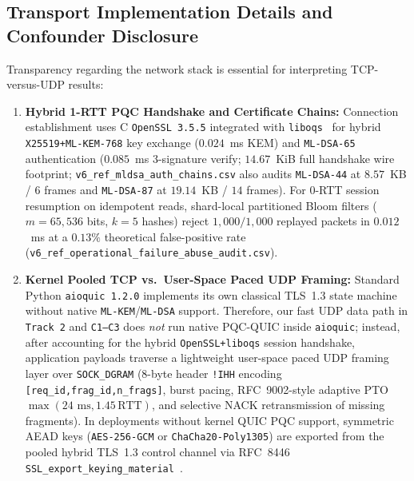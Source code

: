 \documentclass[10pt,journal,compsoc]{IEEEtran}
\begin{document}
\subsection{Transport Implementation Details and Confounder Disclosure}

Transparency regarding the network stack is essential for interpreting TCP-versus-UDP results:
\begin{enumerate}
    \item \textbf{Hybrid 1-RTT PQC Handshake and Certificate Chains:} Connection establishment uses C \texttt{OpenSSL~3.5.5} integrated with \texttt{liboqs}~\cite{stebila2017oqs} for hybrid \nolinkurl{X25519+ML-KEM-768} key exchange ($0.024$~ms KEM) and \texttt{ML-DSA-65} authentication ($0.085$~ms 3-signature verify; $14.67$~KiB full handshake wire footprint; \nolinkurl{v6_ref_mldsa_auth_chains.csv} also audits \texttt{ML-DSA-44} at $8.57$~KB / $6$ frames and \texttt{ML-DSA-87} at $19.14$~KB / $14$ frames). For 0-RTT session resumption on idempotent reads, shard-local partitioned Bloom filters ($m=65{,}536$ bits, $k=5$ hashes) reject $1{,}000/1{,}000$ replayed packets in $0.012$~ms at a $0.13\%$ theoretical false-positive rate (\nolinkurl{v6_ref_operational_failure_abuse_audit.csv}).
    \item \textbf{Kernel Pooled TCP vs.\ User-Space Paced UDP Framing:} Standard Python \texttt{aioquic~1.2.0} implements its own classical TLS~1.3 state machine without native \texttt{ML-KEM}/\texttt{ML-DSA} support. Therefore, our fast UDP data path in \texttt{Track~2} and \texttt{C1--C3} does \emph{not} run native PQC-QUIC inside \texttt{aioquic}; instead, after accounting for the hybrid \nolinkurl{OpenSSL+liboqs} session handshake, application payloads traverse a lightweight user-space paced UDP framing layer over \nolinkurl{SOCK_DGRAM} (8-byte header \texttt{!IHH} encoding \nolinkurl{[req_id,frag_id,n_frags]}, burst pacing, RFC~9002-style adaptive PTO $\max(24\text{ ms}, 1.45\,\mathrm{RTT})$, and selective NACK retransmission of missing fragments). In deployments without kernel QUIC PQC support, symmetric AEAD keys (\texttt{AES-256-GCM} or \nolinkurl{ChaCha20-Poly1305}) are exported from the pooled hybrid TLS~1.3 control channel via RFC~8446 \nolinkurl{SSL_export_keying_material}~\cite{rfc8446}.

\end{enumerate}
\end{document}
